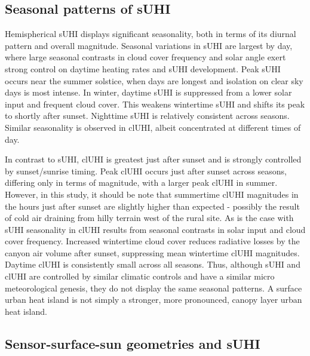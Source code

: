 \subsection{Seasonal patterns of sUHI}

Hemispherical sUHI displays significant seasonality, both in terms of its diurnal pattern and overall magnitude. Seasonal variations in sUHI are largest by day, where large seasonal contrasts in cloud cover frequency and solar angle exert strong control on daytime heating rates and sUHI development. Peak sUHI occurs near the summer solstice, when days are longest and isolation on clear sky days is most intense. In winter, daytime sUHI is suppressed from a lower solar input and frequent cloud cover. This weakens wintertime sUHI and shifts its peak to shortly after sunset. Nighttime sUHI is relatively consistent across seasons. Similar seasonality is observed in clUHI, albeit concentrated at different times of day. 

In contrast to sUHI, clUHI is greatest just after sunset and is strongly controlled by sunset/sunrise timing. Peak clUHI occurs just after sunset across seasons, differing only in terms of magnitude, with a larger peak clUHI in summer. However, in this study, it should be note that summertime clUHI magnitudes in the hours just after sunset are slightly higher than expected \citep{Runnalls2000} - possibly the result of cold air draining from hilly terrain west of the rural site. As is the case with sUHI seasonality in clUHI results from seasonal contrasts in solar input and cloud cover frequency. Increased wintertime cloud cover reduces radiative losses by the canyon air volume after sunset, suppressing mean wintertime clUHI magnitudes. Daytime clUHI is consistently small across all seasons. Thus, although sUHI and clUHI are controlled by similar climatic controls and have a similar micro meteorological genesis, they do not display the same seasonal patterns. A surface urban heat island is not simply a stronger, more pronounced, canopy layer urban heat island.

\subsection{Sensor-surface-sun geometries and sUHI}

